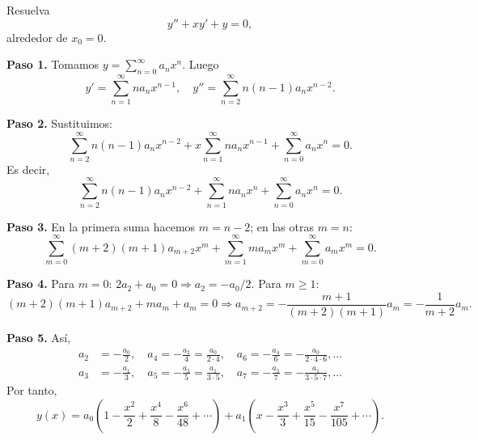 \begin{example}
  Resuelva
  \[
    y'' + x y' + y = 0,
  \]
  alrededor de $x_0=0$.
  \begin{myproof}
    \textbf{Paso 1.} Tomamos $y=\sum_{n=0}^{\infty} a_n x^n$. Luego
    \[
      y'=\sum_{n=1}^{\infty} n a_n x^{n-1},\quad
      y''=\sum_{n=2}^{\infty} n(n-1) a_n x^{n-2}.
    \]
    
    \textbf{Paso 2.} Sustituimos:
    \[
      \sum_{n=2}^{\infty} n(n-1) a_n x^{n-2}
      + x\sum_{n=1}^{\infty} n a_n x^{n-1}
      + \sum_{n=0}^{\infty} a_n x^n = 0.
    \]
    Es decir,
    \[
      \sum_{n=2}^{\infty} n(n-1) a_n x^{n-2}
      + \sum_{n=1}^{\infty} n a_n x^n
      + \sum_{n=0}^{\infty} a_n x^n = 0.
    \]
    
    \textbf{Paso 3.} En la primera suma hacemos $m=n-2$; en las otras $m=n$:
    \[
      \sum_{m=0}^{\infty} (m+2)(m+1) a_{m+2} x^m
      + \sum_{m=1}^{\infty} m a_m x^m
      + \sum_{m=0}^{\infty} a_m x^m = 0.
    \]
    
    \textbf{Paso 4.} Para $m=0$: $2 a_2 + a_0=0 \Rightarrow a_2 = -a_0/2$.
    Para $m\ge 1$:
    \[
      (m+2)(m+1) a_{m+2} + m a_m + a_m = 0
      \Rightarrow
      a_{m+2} = -\frac{m+1}{(m+2)(m+1)} a_m = -\frac{1}{m+2} a_m.
    \]
    
    \textbf{Paso 5.} Así,
    \begin{align*}
      a_2 &= -\frac{a_0}{2},\quad
      a_4 = -\frac{a_2}{4} = \frac{a_0}{2\cdot4},\quad
      a_6 = -\frac{a_4}{6} = -\frac{a_0}{2\cdot4\cdot6},\dots\\
      a_3 &= -\frac{a_1}{3},\quad
      a_5 = -\frac{a_3}{5} = \frac{a_1}{3\cdot5},\quad
      a_7 = -\frac{a_5}{7} = -\frac{a_1}{3\cdot5\cdot7},\dots
    \end{align*}
    Por tanto,
    \[
      \boxed{
        y(x)=a_0\left(1-\frac{x^2}{2}+\frac{x^4}{8}-\frac{x^6}{48}+\cdots\right)
        + a_1\left(x-\frac{x^3}{3}+\frac{x^5}{15}-\frac{x^7}{105}+\cdots\right)
      }.
    \]
  \end{myproof}
\end{example}

